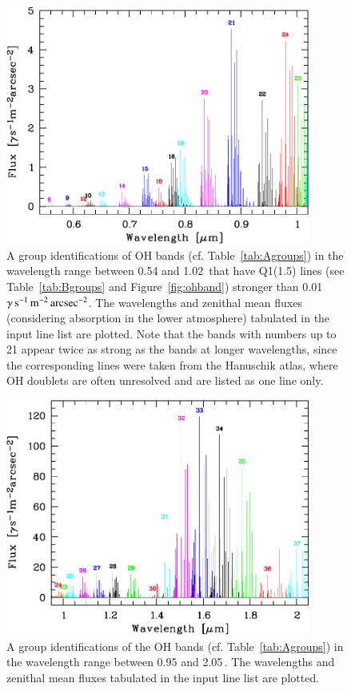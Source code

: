 \begin{figure}
\centering
\includegraphics[width=10cm,clip=true]
{figures/scd_plotohbands_opt.pdf}
\caption[]{A group identifications of OH bands (cf. Table~\ref{tab:Agroups}) in
the wavelength range between 0.54 and 1.02\,\mum{} that have Q1(1.5) lines
(see Table~\ref{tab:Bgroups} and Figure~\ref{fig:ohband}) stronger than
0.01\,$\gamma\,{\rm s}^{-1}\,{\rm m}^{-2}\,{\rm arcsec}^{-2}$. The wavelengths and
zenithal mean fluxes (considering absorption in the lower atmosphere) tabulated
in the input line list are plotted. Note that the bands with numbers up to 21
appear twice as strong as the bands at longer wavelengths, since the
corresponding lines were taken from the Hanuschik \cite{HAN03} atlas, where OH
doublets are often unresolved and are listed as one line only.}
\label{fig:ohbands_opt}
\end{figure}

\begin{figure}
\centering
\includegraphics[width=10cm,clip=true]
{figures/scd_plotohbands_ir.pdf}
\caption[]{A group identifications of the OH bands (cf.
Table~\ref{tab:Agroups}) in the wavelength range between 0.95 and 2.05\,\mum{}.
The wavelengths and zenithal mean fluxes tabulated in the input line list are
plotted.}
\label{fig:ohbands_ir}
\end{figure}


